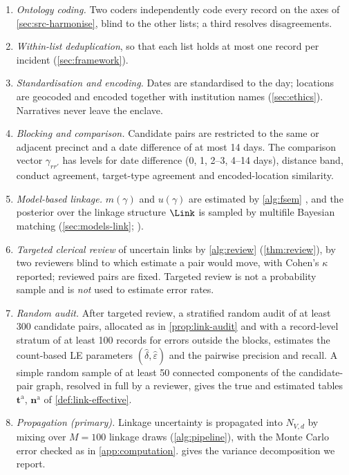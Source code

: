 \begin{enumerate}[1.]
  \item \emph{Ontology coding.} Two coders independently code every record on the axes of \cref{sec:src-harmonise}, blind to the other lists; a third resolves disagreements.
  \item \emph{Within-list deduplication}, so that each list holds at most one record per incident (\cref{sec:framework}).
  \item \emph{Standardisation and encoding.} Dates are standardised to the day; locations are geocoded and encoded together with institution names (\cref{sec:ethics}). Narratives never leave the enclave.
  \item \emph{Blocking and comparison.} Candidate pairs are restricted to the same or adjacent precinct and a date difference of at most 14 days. The comparison vector $\gamma_{rr'}$ has levels for date difference (0, 1, 2--3, 4--14 days), distance band, conduct agreement, target-type agreement and encoded-location similarity.
  \item \emph{Model-based linkage.} $m(\gamma)$ and $u(\gamma)$ are estimated by \cref{alg:fsem} \citep{fellegi1969}, and the posterior over the linkage structure $\Link$ is sampled by multifile Bayesian matching (\cref{sec:models-link}; \citealp{aleshinguendel2023}).
  \item \emph{Targeted clerical review} of uncertain links by \cref{alg:review} (\cref{thm:review}), by two reviewers blind to which estimate a pair would move, with Cohen's $\kappa$ reported; reviewed pairs are fixed. Targeted review is not a probability sample and is \emph{not} used to estimate error rates.
  \item \emph{Random audit.} After targeted review, a stratified random audit of at least 300 candidate pairs, allocated as in \cref{prop:link-audit} and with a record-level stratum of at least 100 records for errors outside the blocks, estimates the count-based LE parameters $(\hat\delta,\hat\varepsilon)$ and the pairwise precision and recall. A simple random sample of at least 50 connected components of the candidate-pair graph, resolved in full by a reviewer, gives the true and estimated tables $\bm t^{\mathrm a}$, $\bm n^{\mathrm a}$ of \cref{def:link-effective}.
  \item \emph{Propagation (primary).} Linkage uncertainty is propagated into $N_{V,d}$ by mixing over $M=100$ linkage draws (\cref{alg:pipeline}), with the Monte Carlo error checked as in \cref{app:computation}.  gives the variance decomposition we report.

\end{enumerate}
